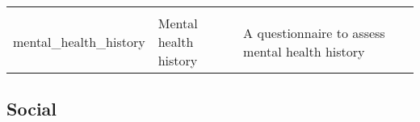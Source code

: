\documentclass[]{book}
\begin{document}
\begin{longtable}[]{@{}llll@{}}
\begin{minipage}[t]{0.18\columnwidth}
\strut
\end{minipage}\tabularnewline
\begin{minipage}[t]{0.22\columnwidth}\raggedright
mental\_health\_history\strut
\end{minipage} & \begin{minipage}[t]{0.27\columnwidth}\raggedright
Mental health history\strut
\end{minipage} & \begin{minipage}[t]{0.22\columnwidth}\raggedright
A questionnaire to assess mental health history\strut
\end{minipage} & \begin{minipage}[t]{0.18\columnwidth}\raggedright
\strut
\end{minipage}\tabularnewline
\bottomrule
\end{longtable}

\hypertarget{social}{%
\subsection{Social}\label{social}}
\end{document}
